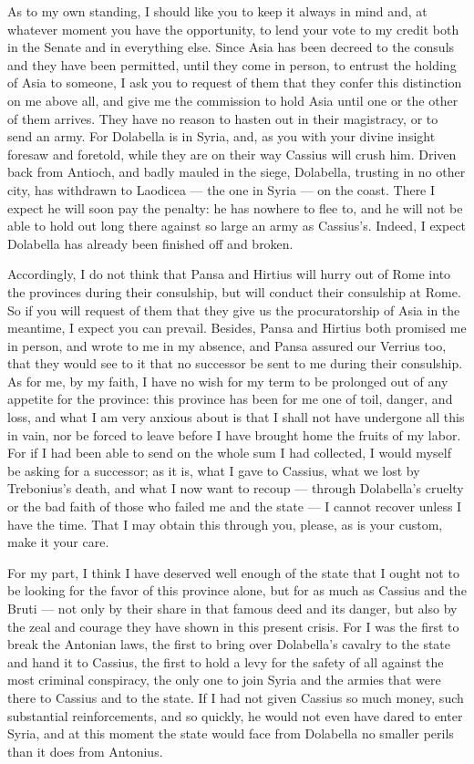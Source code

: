  As to my own standing, I should like you to keep it always in mind and, at whatever moment you have the opportunity, to lend your vote to my credit both in the Senate and in everything else. Since Asia has been decreed to the consuls and they have been permitted, until they come in person, to entrust the holding of Asia to someone, I ask you to request of them that they confer this distinction on me above all, and give me the commission to hold Asia until one or the other of them arrives. They have no reason to hasten out in their magistracy, or to send an army. For Dolabella is in Syria, and, as you with your divine insight foresaw and foretold, while they are on their way Cassius will crush him. Driven back from Antioch, and badly mauled in the siege, Dolabella, trusting in no other city, has withdrawn to Laodicea --- the one in Syria --- on the coast. There I expect he will soon pay the penalty: he has nowhere to flee to, and he will not be able to hold out long there against so large an army as Cassius's. Indeed, I expect Dolabella has already been finished off and broken.

 Accordingly, I do not think that Pansa and Hirtius will hurry out of Rome into the provinces during their consulship, but will conduct their consulship at Rome. So if you will request of them that they give us the procuratorship of Asia in the meantime, I expect you can prevail. Besides, Pansa and Hirtius both promised me in person, and wrote to me in my absence, and Pansa assured our Verrius too, that they would see to it that no successor be sent to me during their consulship. As for me, by my faith, I have no wish for my term to be prolonged out of any appetite for the province: this province has been for me one of toil, danger, and loss, and what I am very anxious about is that I shall not have undergone all this in vain, nor be forced to leave before I have brought home the fruits of my labor. For if I had been able to send on the whole sum I had collected, I would myself be asking for a successor; as it is, what I gave to Cassius, what we lost by Trebonius's death, and what I now want to recoup --- through Dolabella's cruelty or the bad faith of those who failed me and the state --- I cannot recover unless I have the time. That I may obtain this through you, please, as is your custom, make it your care.

 For my part, I think I have deserved well enough of the state that I ought not to be looking for the favor of this province alone, but for as much as Cassius and the Bruti --- not only by their share in that famous deed and its danger, but also by the zeal and courage they have shown in this present crisis. For I was the first to break the Antonian laws, the first to bring over Dolabella's cavalry to the state and hand it to Cassius, the first to hold a levy for the safety of all against the most criminal conspiracy, the only one to join Syria and the armies that were there to Cassius and to the state. If I had not given Cassius so much money, such substantial reinforcements, and so quickly, he would not even have dared to enter Syria, and at this moment the state would face from Dolabella no smaller perils than it does from Antonius.


